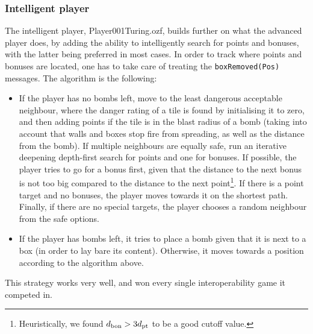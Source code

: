 \documentclass[12pt,journal]{IEEEtran}
\newcommand{\ntt}{\normalfont\ttfamily}
\newcommand{\fn}[1]{{\protect\ntt#1}}
\begin{document}
\subsubsection{Intelligent player}
The intelligent player, \fn{Player001Turing.ozf}, builds further on what the advanced player does, by adding the ability to intelligently search for points and bonuses, with the latter being preferred in most cases.
In order to track where points and bonuses are located, one has to take care of treating the \lstinline|boxRemoved(Pos)| messages.
The algorithm is the following:
\begin{itemize}
	\item If the player has no bombs left, move to the least dangerous acceptable neighbour, where the danger rating of a tile is found by initialising it to zero, and then adding points if the tile is in the blast radius of a bomb (taking into account that walls and boxes stop fire from spreading, as well as the distance from the bomb).
	If multiple neighbours are equally safe, run an iterative deepening depth-first search for points and one for bonuses.
	If possible, the player tries to go for a bonus first, given that the distance to the next bonus is not too big compared to the distance to the next point\footnote{Heuristically, we found \(d_{\textnormal{bon}} > 3d_{\textnormal{pt}}\) to be a good cutoff value.}.
	If there is a point target and no bonuses, the player moves towards it on the shortest path.
	Finally, if there are no special targets, the player chooses a random neighbour from the safe options.
	\item If the player has bombs left, it tries to place a bomb given that it is next to a box (in order to lay bare its content).
	Otherwise, it moves towards a position according to the algorithm above.
\end{itemize}

This strategy works very well, and won every single interoperability game it competed in.
\end{document}
